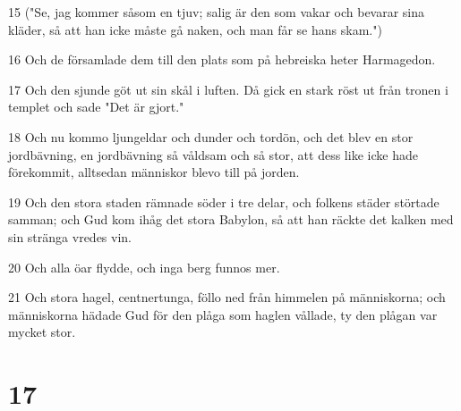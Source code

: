 \par 15 ("Se, jag kommer såsom en tjuv; salig är den som vakar och bevarar sina kläder, så att han icke måste gå naken, och man får se hans skam.")
\par 16 Och de församlade dem till den plats som på hebreiska heter Harmagedon.
\par 17 Och den sjunde göt ut sin skål i luften. Då gick en stark röst ut från tronen i templet och sade "Det är gjort."
\par 18 Och nu kommo ljungeldar och dunder och tordön, och det blev en stor jordbävning, en jordbävning så våldsam och så stor, att dess like icke hade förekommit, alltsedan människor blevo till på jorden.
\par 19 Och den stora staden rämnade söder i tre delar, och folkens städer störtade samman; och Gud kom ihåg det stora Babylon, så att han räckte det kalken med sin stränga vredes vin.
\par 20 Och alla öar flydde, och inga berg funnos mer.
\par 21 Och stora hagel, centnertunga, föllo ned från himmelen på människorna; och människorna hädade Gud för den plåga som haglen vållade, ty den plågan var mycket stor.

\chapter{17}

